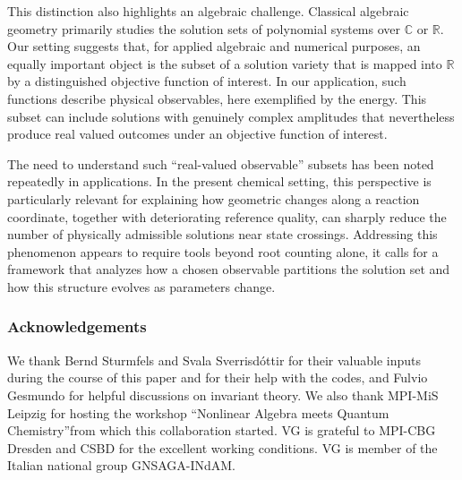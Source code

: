 \documentclass[11pt,reqno]{amsart}
\theoremstyle{definition}
\numberwithin{theorem}{section}
\numberwithin{equation}{section}
\begin{document}
This distinction also highlights an algebraic challenge. Classical algebraic geometry primarily studies the solution sets of polynomial systems over $\mathbb{C}$ or $\mathbb{R}$. Our setting suggests that, for applied algebraic and numerical purposes, an equally important object is the subset of a solution variety that is mapped into $\mathbb{R}$ by a distinguished objective function of interest. In our application, such functions describe physical observables, here exemplified by the energy. This subset can include solutions with genuinely complex amplitudes that nevertheless produce real valued outcomes under an objective function of interest.  

The need to understand such ``real-valued observable'' subsets has been noted repeatedly in applications. In the present chemical setting, this perspective is particularly relevant for explaining how geometric changes along a reaction coordinate, together with deteriorating reference quality, can sharply reduce the number of physically admissible solutions near state crossings. Addressing this phenomenon appears to require tools beyond root counting alone, it calls for a framework that analyzes how a chosen observable partitions the solution set and how this structure evolves as parameters change.


\subsubsection*{Acknowledgements}
We thank Bernd Sturmfels and Svala Sverrisd{\'o}ttir for their valuable inputs during the course of this paper and for their help with the codes, and Fulvio Gesmundo for helpful discussions on invariant theory. We also thank MPI-MiS Leipzig for hosting the workshop \textquotedblleft Nonlinear Algebra meets Quantum Chemistry\textquotedblright \space from which this collaboration started. VG is grateful to MPI-CBG Dresden and CSBD for the excellent working conditions. VG is member of the Italian national group GNSAGA-INdAM.


\newpage
\small



 
\end{document}

